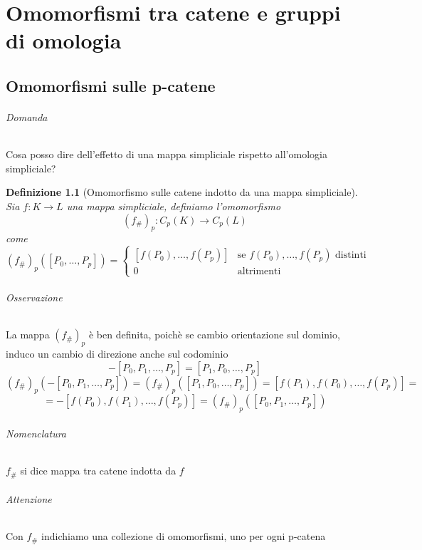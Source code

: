 \documentclass[a4paper]{report}
\newtheorem{definition}{Definizione}
\newcommand{\ra}{\ensuremath{\rightarrow}}
\newcommand{\shrp}[1]{\ensuremath{({#1}_\#)_p}}
\begin{document}
\part{Omomorfismi tra catene e gruppi di omologia}
\chapter{Omomorfismi sulle p-catene}
\paragraph{Domanda} Cosa posso dire dell'effetto di una mappa simpliciale rispetto all'omologia simpliciale?
\begin{definition}[Omomorfismo sulle catene indotto da una mappa simpliciale]
    Sia $f:K\ra L$ una mappa simpliciale, definiamo l'omomorfismo
    \[
        \shrp{f}:C_p(K)\ra C_p(L)
    \]
    come
    \[
        \shrp{f}([P_0,\dots,P_p])=\begin{cases}
            [f(P_0),\dots,f(P_p)] & \text{se } f(P_0),\dots,f(P_p)\text{ distinti} \\
            0                     & \text{altrimenti}
        \end{cases}
    \]
\end{definition}
\paragraph{Osservazione} La mappa \shrp{f} è ben definita, poichè se cambio orientazione sul dominio, induco un cambio di direzione anche sul codominio
\[
    -[P_0,P_1,\dots,P_p]=[P_1,P_0,\dots,P_p]
\]
\[
    \shrp{f}(-[P_0,P_1,\dots,P_p])=\shrp{f}([P_1,P_0,\dots,P_p])=[f(P_1),f(P_0),\dots,f(P_p)]=
\]
\[
    =-[f(P_0),f(P_1),\dots,f(P_p)]=\shrp{f}([P_0,P_1,\dots,P_p])
\]
\paragraph{Nomenclatura} $f_\#$ si dice mappa tra catene indotta da $f$
\paragraph{Attenzione} Con $f_\#$ indichiamo una collezione di omomorfismi, uno per ogni p-catena
\end{document}

